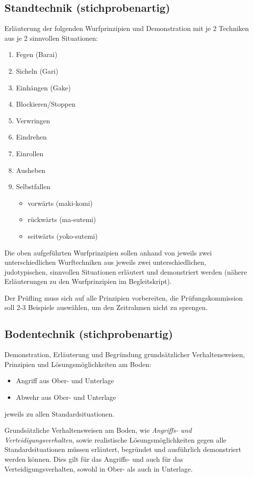 \documentclass[justified, a4paper, notitlepage, captions=tableheading, nobib]{tufte-handout}
\begin{document}
\subsection{Standtechnik (stichprobenartig)}
\label{sec:orgd78ae49}
Erläuterung der folgenden Wurfprinzipien und Demonstration mit je 2 Techniken aus je 2 sinnvollen Situationen:
\begin{enumerate}
\item Fegen (Barai)
\item Sicheln (Gari)
\item Einhängen (Gake)
\item Blockieren/Stoppen
\item Verwringen
\item Eindrehen
\item Einrollen
\item Ausheben
\item Selbstfallen
\begin{itemize}
\item vorwärts (maki-komi)
\item rückwärts (ma-sutemi)
\item seitwärts (yoko-sutemi)
\end{itemize}
\end{enumerate}

Die oben aufgeführten Wurfprinzipien sollen anhand von jeweils zwei unterschiedlichen Wurftechniken aus jeweils zwei unterschiedlichen, judotypischen, sinnvollen Situationen erläutert und demonstriert werden (nähere Erläuterungen zu den Wurfprinzipien im Begleitskript).

Der Prüfling muss sich auf alle Prinzipien vorbereiten, die Prüfungskommission soll 2-3 Beispiele auswählen, um den Zeitrahmen nicht zu sprengen.

\subsection{Bodentechnik (stichprobenartig)}
\label{sec:org02b2cdb}
Demonstration, Erläuterung und Begründung grundsätzlicher Verhaltensweisen, Prinzipien und Lösungsmöglichkeiten am Boden:
\begin{itemize}
\item Angriff aus Ober- und Unterlage
\item Abwehr aus Ober- und Unterlage
\end{itemize}
jeweils zu allen Standardsituationen.

Grundsätzliche Verhaltensweisen am Boden, wie \emph{Angriffs- und Verteidigungsverhalten}, sowie realistische Lösungsmöglichkeiten gegen alle Standardsituationen müssen erläutert, begründet und ausführlich demonstriert werden können. Dies gilt für das Angriffs- und auch für das Verteidigungsverhalten, sowohl in Ober- als auch in Unterlage. 
\end{document}
